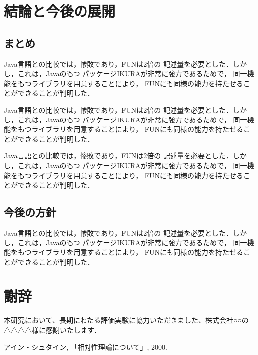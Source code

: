 \documentclass{funthesis}
\begin{document}
\chapter{結論と今後の展開}

\section{まとめ}

Java言語との比較では，惨敗であり，FUNは2倍の
記述量を必要とした．しかし，これは，Javaのもつ
パッケージIKURAが非常に強力であるためで，
同一機能をもつライブラリを用意することにより，
FUNにも同様の能力を持たせることができることが判明した．

Java言語との比較では，惨敗であり，FUNは2倍の
記述量を必要とした．しかし，これは，Javaのもつ
パッケージIKURAが非常に強力であるためで，
同一機能をもつライブラリを用意することにより，
FUNにも同様の能力を持たせることができることが判明した．

Java言語との比較では，惨敗であり，FUNは2倍の
記述量を必要とした．しかし，これは，Javaのもつ
パッケージIKURAが非常に強力であるためで，
同一機能をもつライブラリを用意することにより，
FUNにも同様の能力を持たせることができることが判明した．

\section{今後の方針}

Java言語との比較では，惨敗であり，FUNは2倍の
記述量を必要とした．しかし，これは，Javaのもつ
パッケージIKURAが非常に強力であるためで，
同一機能をもつライブラリを用意することにより，
FUNにも同様の能力を持たせることができることが判明した．


\chapter*{謝辞}

本研究において、長期にわたる評価実験に協力いただきました、株式会社○○の△△△△様に感謝いたします．


\begin{thebibliography}{9}
  アイン・シュタイン, 「相対性理論について」, 2000.
\end{thebibliography}


\appendix
\end{document}

